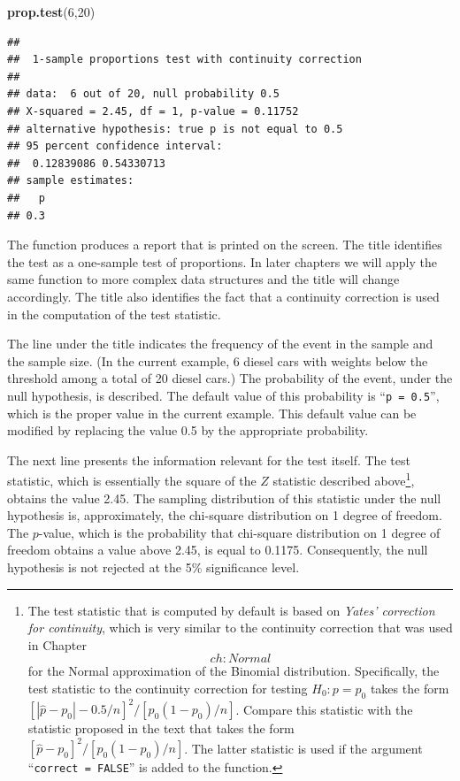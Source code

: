 \documentclass[]{krantz}
\makeatletter
\newenvironment{Shaded}{\begin{snugshade}}{\end{snugshade}}
\newcommand{\DecValTok}[1]{\textcolor[rgb]{0.00,0.00,0.81}{#1}}
\newcommand{\KeywordTok}[1]{\textcolor[rgb]{0.13,0.29,0.53}{\textbf{#1}}}
\newcommand{\NormalTok}[1]{#1}
\newenvironment{kframe}{%
\medskip{}
\setlength{\fboxsep}{.8em}
 \def\at@end@of@kframe{}%
 \ifinner\ifhmode%
  \def\at@end@of@kframe{\end{minipage}}%
  \begin{minipage}{\columnwidth}%
 \fi\fi%
 \def\FrameCommand##1{\hskip\@totalleftmargin \hskip-\fboxsep
 \colorbox{shadecolor}{##1}\hskip-\fboxsep
     \hskip-\linewidth \hskip-\@totalleftmargin \hskip\columnwidth}%
 \MakeFramed {\advance\hsize-\width
   \@totalleftmargin\z@ \linewidth\hsize
   \@setminipage}}%
 {\par\unskip\endMakeFramed%
 \at@end@of@kframe}
\renewenvironment{Shaded}{\begin{kframe}}{\end{kframe}}
\theoremstyle{definition}
\theoremstyle{definition}
\theoremstyle{definition}
\theoremstyle{remark}
\makeatother
\begin{document}
\begin{Shaded}
\begin{Highlighting}[]
\KeywordTok{prop.test}\NormalTok{(}\DecValTok{6}\NormalTok{,}\DecValTok{20}\NormalTok{)}
\end{Highlighting}
\end{Shaded}

\begin{verbatim}
## 
##  1-sample proportions test with continuity correction
## 
## data:  6 out of 20, null probability 0.5
## X-squared = 2.45, df = 1, p-value = 0.11752
## alternative hypothesis: true p is not equal to 0.5
## 95 percent confidence interval:
##  0.12839086 0.54330713
## sample estimates:
##   p 
## 0.3
\end{verbatim}

The function produces a report that is printed on the screen. The title
identifies the test as a one-sample test of proportions. In later
chapters we will apply the same function to more complex data structures
and the title will change accordingly. The title also identifies the
fact that a continuity correction is used in the computation of the test
statistic.

The line under the title indicates the frequency of the event in the
sample and the sample size. (In the current example, 6 diesel cars with
weights below the threshold among a total of 20 diesel cars.) The
probability of the event, under the null hypothesis, is described. The
default value of this probability is ``\texttt{p\ =\ 0.5}'', which is the proper
value in the current example. This default value can be modified by
replacing the value 0.5 by the appropriate probability.

The next line presents the information relevant for the test itself. The
test statistic, which is essentially the square of the \(Z\) statistic
described above\footnote{The test statistic that is computed by default is based on
  \emph{Yates' correction for continuity}, which is very similar to the
  continuity correction that was used in Chapter~\[ch:Normal\] for the
  Normal approximation of the Binomial distribution. Specifically, the
  test statistic to the continuity correction for testing
  \(H_0:p = p_0\) takes the form
  \([|\hat p - p_0|-0.5/n]^2/[p_0(1-p_0)/n]\). Compare this statistic
  with the statistic proposed in the text that takes the form
  \([\hat p - p_0]^2/[p_0(1-p_0)/n]\). The latter statistic is used if
  the argument ``\texttt{correct\ =\ FALSE}'' is added to the function.}, obtains the value 2.45. The sampling distribution
of this statistic under the null hypothesis is, approximately, the
chi-square distribution on 1 degree of freedom. The \(p\)-value, which is
the probability that chi-square distribution on 1 degree of freedom
obtains a value above 2.45, is equal to 0.1175. Consequently, the null
hypothesis is not rejected at the 5\% significance level.
\end{document}
